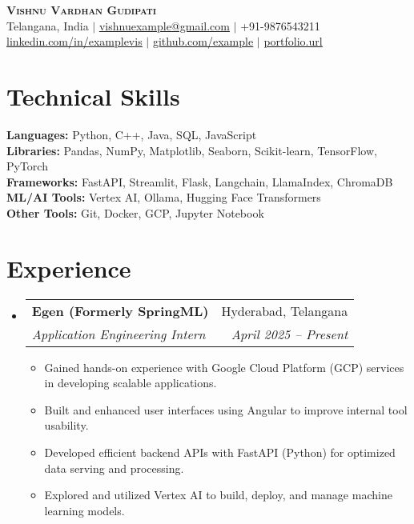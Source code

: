 \documentclass[letterpaper,11pt]{article}
\makeatletter
\newcommand{\resumeItem}[1]{
  \item\small{{#1 \vspace{-2pt}}}
}
\newcommand{\resumeSubheading}[4]{
  \vspace{-2pt}\item
    \begin{tabular*}{0.97\textwidth}[t]{l@{\extracolsep{\fill}}r}
      \textbf{#1} & #2 \\
      \textit{\small#3} & \textit{\small #4} \\
    \end{tabular*}\vspace{-7pt}
}
\newcommand{\resumeSubHeadingListStart}{\begin{itemize}[leftmargin=0.15in, label={}]}
\newcommand{\resumeSubHeadingListEnd}{\end{itemize}}
\newcommand{\resumeItemListStart}{\begin{itemize}}
\newcommand{\resumeItemListEnd}{\end{itemize}\vspace{-5pt}}
\makeatother
\begin{document}
\begin{center}
    \textbf{\Huge \scshape Vishnu Vardhan Gudipati} \\ \vspace{1pt}
    \small Telangana, India $|$ \href{mailto:vishnurexample@gmail.com}{\underline{vishnuexample@gmail.com}} $|$ {+91-9876543211} \\
    \href{https://linkedin.com/in/visexample}{\underline{linkedin.com/in/examplevis}} $|$
    \href{https://github.com/vishexample}{\underline{github.com/example}} $|$
    \href{https://portfolio}{\underline{portfolio.url}}
\end{center}

\section{Technical Skills}
 \begin{itemize}[leftmargin=0.15in, label={}]
    \small{\item{
     \textbf{Languages:} Python, C++, Java, SQL, JavaScript \\
     \textbf{Libraries:} Pandas, NumPy, Matplotlib, Seaborn, Scikit-learn, TensorFlow, PyTorch \\
     \textbf{Frameworks:} FastAPI, Streamlit, Flask, Langchain, LlamaIndex, ChromaDB \\
     \textbf{ML/AI Tools:} Vertex AI, Ollama, Hugging Face Transformers \\
     \textbf{Other Tools:} Git, Docker, GCP, Jupyter Notebook
    }}
 \end{itemize}

\section{Experience}
  \resumeSubHeadingListStart
    \resumeSubheading
      {Egen (Formerly SpringML)}{Hyderabad, Telangana}
      {Application Engineering Intern}{April 2025 -- Present}
      \resumeItemListStart
        \resumeItem{Gained hands-on experience with Google Cloud Platform (GCP) services in developing scalable applications.}
        \resumeItem{Built and enhanced user interfaces using Angular to improve internal tool usability.}
        \resumeItem{Developed efficient backend APIs with FastAPI (Python) for optimized data serving and processing.}
        \resumeItem{Explored and utilized Vertex AI to build, deploy, and manage machine learning models.}
      \resumeItemListEnd
  \resumeSubHeadingListEnd
\end{document}
